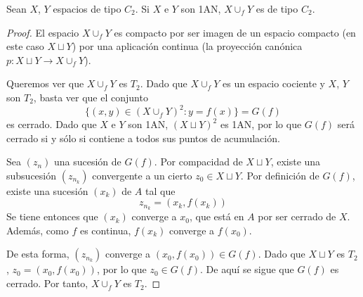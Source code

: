 
\begin{lemma}
\label{AdjC2} Sean $X$, $Y$ espacios de tipo $C_2$. Si $X$ e $Y$ son 1AN,
$X\cup_f Y$ es de tipo $C_2$.
\end{lemma}

\begin{proof}
El espacio $X\cup_f Y$ es compacto por ser imagen de un espacio compacto
(en este caso $X\sqcup Y$) por una aplicación continua (la proyección
canónica $p\colon X\sqcup Y \to X\cup_f Y$).

Queremos ver que $X\cup_f Y$ es $T_2$. Dado que $X\cup_f Y$ es un espacio
cociente y $X$, $Y$ son $T_2$, basta ver que el conjunto
\[\{(x,y) \in (X\cup_f Y)^2\colon y=f(x)\}=G(f)\]
es cerrado. Dado que $X$ e $Y$ son 1AN, $(X\sqcup Y)^2$ es 1AN, por lo que
$G(f)$ será cerrado si y sólo si contiene a todos sus puntos de acumulación.


Sea $(z_n)$ una sucesión de $G(f)$. Por compacidad de $X \sqcup Y$, existe
una subsucesión $(z_{n_k})$ convergente a un cierto $z_0 \in X\sqcup Y$. Por
definición de $G(f)$, existe una sucesión $(x_k)$ de $A$ tal que
\[z_{n_k}=(x_k,f(x_k))\]
Se tiene entonces que $(x_k)$ converge a $x_0$, que está en $A$ por ser
cerrado de $X$. Además, como $f$ es continua, $f(x_k)$ converge a $f(x_0)$.

De esta forma, $(z_{n_k})$ converge a $(x_0,f(x_0)) \in G(f)$. Dado que
$X\sqcup Y$ es $T_2$, $z_0=(x_0,f(x_0))$, por lo que $z_0 \in G(f)$. De aquí
se sigue que $G(f)$ es cerrado. Por tanto, $X\cup_f Y$ es $T_2$.
\end{proof}

